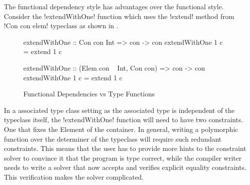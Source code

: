 \documentclass[screen,nonacm,manuscript,review]{acmart} %
\begin{document}
The functional dependency style has advantages over the
functional style\cite{jones_language_2008}. Consider the !extendWithOne!
function which uses the !extend! method from !Con con elem!
typeclass as shown in .
\begin{figure}[ht]
\centering
\begin{minipage}{0.5\linewidth}
\begin{code}
       extendWithOne :: Con con Int
                     => con -> con
       extendWithOne 1 c = extend 1 c
\end{code}
\end{minipage}%
\begin{minipage}{0.5\linewidth}
\begin{code}
      extendWithOne :: (Elem con ~ Int, Con con)
                    => con -> con
      extendWithOne 1 c = extend 1 c
\end{code}
\end{minipage}
\caption[FundDeps or TFs]{Functional Dependencies vs Type Functions}
\label{fig:fundep-vs-tfs}
\end{figure}

In a associated type class setting as the associated type is
independent of the typeclass itself, the !extendWithOne! function will
need to have two constraints. One that fixes the Element of the
container. In general, writing a polymorphic function over the
determiner of the typeclass will require such redundant
constraints. This means that the user has to provide more hints to the
constraint solver to convince it that the program is type correct,
while the compiler writer needs to write a solver that now accepts and
verifies explicit equality constraints. This verification makes the
solver complicated.
\end{document}
